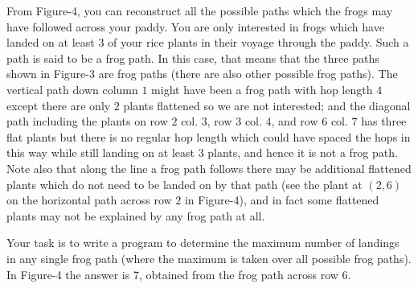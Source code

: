 From Figure-4, you can reconstruct all the possible paths which the frogs may have followed across your paddy. You are only interested in frogs which have landed on at least $3$ of your rice plants in their voyage through the paddy. Such a path is said to be a frog path. In this case, that means that the three paths shown in Figure-3 are frog paths (there are also other possible frog paths). The vertical path down column $1$ might have been a frog path with hop length $4$ except there are only $2$ plants flattened so we are not interested; and the diagonal path including the plants on row $2$ col. $3$, row $3$ col. $4$, and row $6$ col. $7$ has three flat plants but there is no regular hop length which could have spaced the hops in this way while still landing on at least $3$ plants, and hence it is not a frog path. Note also that along the line a frog path follows there may be additional flattened plants which do not need to be landed on by
that path (see the plant at $(2, 6)$ on the horizontal path across row $2$ in Figure-4), and in fact some flattened plants may not be explained by any frog path at all.

Your task is to write a program to determine the maximum number of landings in any single frog path
(where the maximum is taken over all possible frog paths). In Figure-4 the answer is 7, obtained from
the frog path across row 6.

